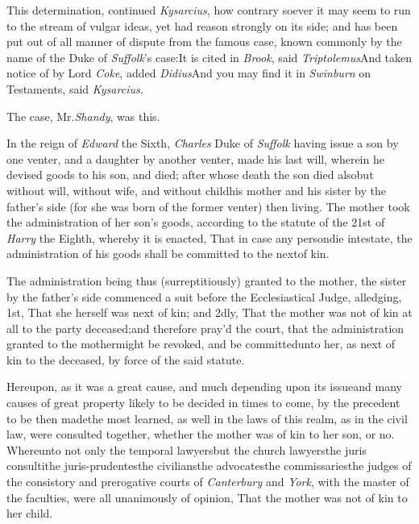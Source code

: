 \documentclass{article}
\begin{document}
This determination, continued \textit{Kysarcius}, how
contrary soever it may seem\break
to run to the stream of vulgar ideas,\break
yet had reason strongly on its side; and has been put out of all
manner of dispute from the famous case, known commonly by the name
of the Duke of \textit{Suffolk}’s case:\tsh It is
cited in \textit{Brook}, said \textit{Triptolemus}\tsh And
taken notice of by Lord \textit{Coke}, added \textit{Didius}\tsk And
you may find it in \textit{Swinburn} on Testaments, said
\textit{Kysarcius.}

The case, Mr.\@ \textit{Shandy}, was this.

In the reign of \textit{Edward} the Sixth,\break
\textit{Charles} Duke of \textit{Suffolk} having issue a son
by one venter, and a daughter by\break
another venter, made his last will,\break
wherein he devised goods to his son,\break
and died; after whose death the son died also\tsk but
without will, without wife, and without child\tsk his mother and
his sister by the father’s side (for she was born of the
former venter) then living. The mother took the administration of
her son’s goods, according to the statute of the 21st of \textit{Harry} the Eighth, whereby it is
enacted, That in case any person\break die intestate, the administration
of his goods shall be committed to the next\break of kin.

The administration being thus (surreptitiously) granted to the
mother, the sister by the father’s side commenced a suit
before the Ecclesiastical Judge, al\-ledging, 1st, That she herself
was next of kin; and 2dly, That the mother was not of kin at all to
the party deceased;\break and therefore pray’d the court, that the
administration granted to the mother\break might be revoked, and be
committed\break unto her, as next of kin to the deceased, by force of the
said statute.

Hereupon, as it was a great cause, and much depending upon its issue\tsk and many
causes of great property likely to be decided in times to come, by the precedent to
be then made\tsh the most learned, as well in the laws of this realm, as in the
civil law, were consulted together, whether the mother was
of kin to her son, or no.
\tsk Whereunto not only the temporal lawyers\tsk but the church lawyers\tsk the
juris consulti\tsk the juris-prudentes\tsk the civilians\tsk the advocates\tsk the
commissaries\tsk the judges of the consistory and prerogative courts of
\textit{Canterbury} and \textit{York}, with the master of the faculties, were all
unanimously of opinion, That the mother was not of \fnast\break
kin to her child.\tsh
\end{document}
